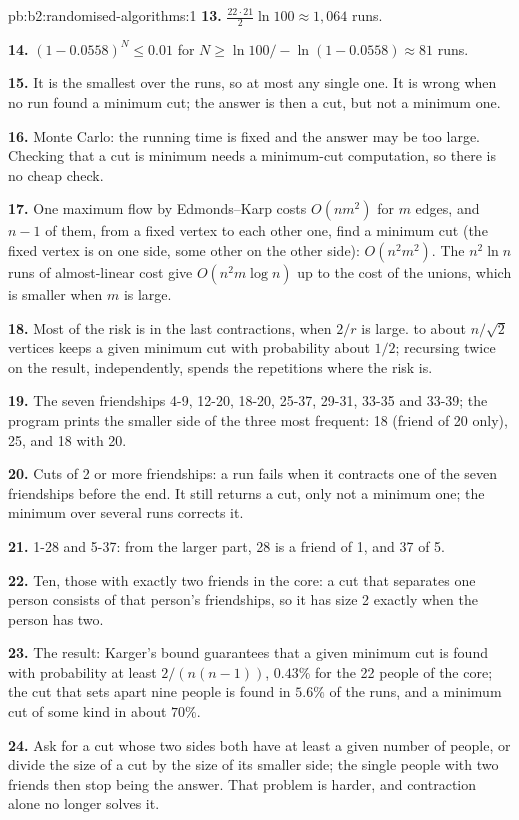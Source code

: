 \begin{solution}{pb:b2:randomised-algorithms:1}
\textbf{13.} $\frac{22 \cdot 21}{2} \ln 100 \approx 1{,}064$ runs.

\textbf{14.} $(1 - 0.0558)^N \leq 0.01$ for $N \geq \ln 100 / -\ln(1 - 0.0558) \approx 81$ runs.

\textbf{15.} It is the smallest over the runs, so at most any single one. It is wrong when no run found a minimum cut;
the answer is then a cut, but not a minimum one.

\textbf{16.} Monte Carlo: the running time is fixed and the answer may be too large. Checking that a cut is minimum
needs a minimum-cut computation, so there is no cheap check.

\textbf{17.} One maximum flow by Edmonds--Karp costs $O(n m^2)$ for $m$ edges, and $n - 1$ of them, from a fixed vertex
to each other one, find a minimum cut (the fixed vertex is on one side, some other on the other side): $O(n^2 m^2)$. The
$n^2 \ln n$ runs of almost-linear cost give $O(n^2 m \log n)$ up to the cost of the unions, which is smaller when $m$ is
large.

\textbf{18.} Most of the risk is in the last contractions, when $2/r$ is large.  to about $n/\sqrt{2}$
vertices keeps a given minimum cut with probability about $1/2$; recursing twice on the result, independently, spends
the repetitions where the risk is.

\textbf{19.} The seven friendships 4-9, 12-20, 18-20, 25-37, 29-31, 33-35 and 33-39; the program prints the smaller side
of the three most frequent: 18 (friend of 20 only), 25, and 18 with 20.

\textbf{20.} Cuts of 2 or more friendships: a run fails when it contracts one of the seven friendships before the end.
It still returns a cut, only not a minimum one; the minimum over several runs corrects it.

\textbf{21.} 1-28 and 5-37: from the larger part, 28 is a friend of 1, and 37 of 5.

\textbf{22.} Ten, those with exactly two friends in the core: a cut that separates one person consists of that person's
friendships, so it has size 2 exactly when the person has two.

\textbf{23.} The result: Karger's bound guarantees that a given minimum cut is found with probability at least $2/(n(n -
1))$, $0.43\%$ for the 22 people of the core; the cut that sets apart nine people is found in $5.6\%$ of the runs, and a
minimum cut of some kind in about $70\%$.

\textbf{24.} Ask for a cut whose two sides both have at least a given number of people, or divide the size of a cut by
the size of its smaller side; the single people with two friends then stop being the answer. That problem is harder, and
contraction alone no longer solves it.
\end{solution}
